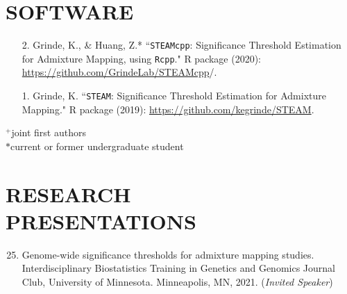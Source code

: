 \documentclass[margin]{res}
\newenvironment{benumerate}[1]{
    \let\oldItem\item
    \def\item{\addtocounter{enumi}{-2}\oldItem}
    
    \begin{enumerate}
    \setcounter{enumi}{#1}
    \addtocounter{enumi}{1}
}{
    \end{enumerate}
}
\begin{document}
\begin{resume}


\section{SOFTWARE} 

\begin{itemize}
\item[2.] Grinde, K., \& Huang, Z.* ``\texttt{STEAMcpp}: Significance Threshold Estimation for Admixture Mapping, using \texttt{Rcpp}." R package (2020): \\ \href{https://github.com/GrindeLab/STEAMcpp}{https://github.com/GrindeLab/STEAMcpp}/.
\item[1.] Grinde, K. ``\texttt{STEAM}: Significance Threshold Estimation for Admixture Mapping." R package (2019): \href{https://github.com/kegrinde/STEAM}{https://github.com/kegrinde/STEAM}.
\end{itemize}
					
$^{+}$joint first authors\\
$*$current or former undergraduate student\\

\section{RESEARCH \\ PRESENTATIONS}

\begin{benumerate}{24} %

\item Genome-wide significance thresholds for admixture mapping studies. Interdisciplinary Biostatistics Training in Genetics and Genomics Journal Club, University of Minnesota. Minneapolis, MN, 2021. (\textit{Invited Speaker})


\end{benumerate}
\end{resume}
\end{document}

